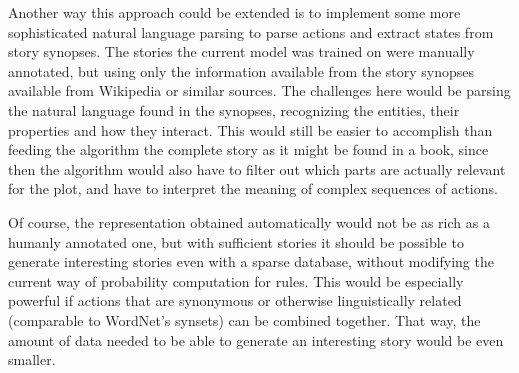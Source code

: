 
Another way this approach could be extended is to implement some more sophisticated
natural language parsing to parse actions and extract states from story synopses.
The stories the current model was trained
on were manually annotated, but using only the information available from the
story synopses available from Wikipedia or similar sources. The challenges here
would be parsing the natural language found in the synopses, recognizing the
entities, their properties and how they interact.
This would still be easier to accomplish than feeding the algorithm the complete
story as it might be found in a book, since then the algorithm would also have
to filter out which parts are actually relevant for the plot, and have to
interpret the meaning of complex sequences of actions.

Of course, the representation obtained automatically would not be as rich as a
humanly annotated one, but with sufficient stories it should be possible to
generate interesting stories even with a sparse database, without modifying the
current way of probability computation for rules. This would be especially
powerful if actions that are synonymous or otherwise linguistically related
(comparable to WordNet's synsets) can be combined together. That way, the amount
of data needed to be able to generate an interesting story would be even
smaller.
